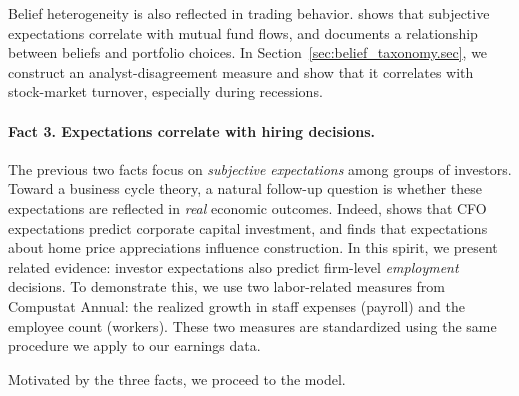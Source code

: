 

Belief heterogeneity is also reflected in trading behavior. \citet{greenwood_expectations_2014} shows that subjective expectations correlate with mutual fund flows, and \citet{GMSU_AER} documents a relationship between beliefs and portfolio choices. In Section~\ref{sec:belief_taxonomy.sec}, we construct an analyst-disagreement measure and show that it correlates with stock-market turnover, especially during recessions.

\paragraph{Fact 3. Expectations correlate with hiring decisions.}



The previous two facts focus on \emph{subjective expectations} among groups of investors. Toward a business cycle theory, a natural follow-up question is whether these expectations are reflected in \emph{real} economic outcomes. Indeed, \citet{GMS16} shows that CFO expectations predict corporate capital investment, and \citet{armona2019home} finds that expectations about home price appreciations influence construction. In this spirit, we present related evidence: investor expectations also predict firm-level \emph{employment} decisions. To demonstrate this, we use two labor-related measures from Compustat Annual: the realized growth in staff expenses (payroll) and the employee count (workers). These two measures are standardized using the same procedure we apply to our earnings data.


Motivated by the three facts, we proceed to the model.